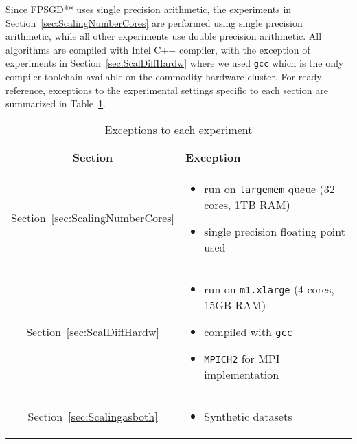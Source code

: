 \documentclass{vldb}
\begin{document}
Since FPSGD** uses single precision arithmetic, the experiments in
Section~\ref{sec:ScalingNumberCores} are performed using single
precision arithmetic, while all other experiments use double precision
arithmetic.  All algorithms are compiled with Intel C++ compiler, with
the exception of experiments in Section~\ref{sec:ScalDiffHardw} where we
used \texttt{gcc} which is the only compiler toolchain available on the
commodity hardware cluster.  For ready reference, exceptions to the
experimental settings specific to each section are summarized in
Table~\ref{tab:exceptions}.

\begin{table}[htbp]
  \centering
  \caption{Exceptions to each experiment}
  {\small
    \begin{tabular}[htbp]{|c|p{}|}
      \hline 
    Section & Exception \\
    \hline
    Section~\ref{sec:ScalingNumberCores} & 
    \mbox{}\par\vspace{-\baselineskip}
    \begin{itemize}[noitemsep,leftmargin=*,topsep=0pt,partopsep=0pt] 
    \item run on \texttt{largemem} queue (32 cores, 1TB RAM)
    \item single precision floating point used
    \end{itemize}
    \mbox{}\par\vspace{-2\baselineskip}
    \\
\hline
    Section~\ref{sec:ScalDiffHardw} & 
    \mbox{}\par\vspace{-\baselineskip}
    \begin{itemize}[noitemsep,leftmargin=*,topsep=0pt,partopsep=0pt]
    \item run on \texttt{m1.xlarge} (4 cores, 15GB RAM)
    \item compiled with \texttt{gcc}
    \item \texttt{MPICH2} for MPI implementation
    \end{itemize}
    \mbox{}\par\vspace{-2\baselineskip}\\
    \hline
    Section~\ref{sec:Scalingasboth} & 
    \mbox{}\par\vspace{-\baselineskip}
    \begin{itemize}[noitemsep,leftmargin=*,topsep=0pt,partopsep=0pt]
    \item Synthetic datasets
    \end{itemize}
    \mbox{}\par\vspace{-2\baselineskip}\\
    \hline
  \end{tabular}
  }
  \label{tab:exceptions}
\end{table}
\end{document}
